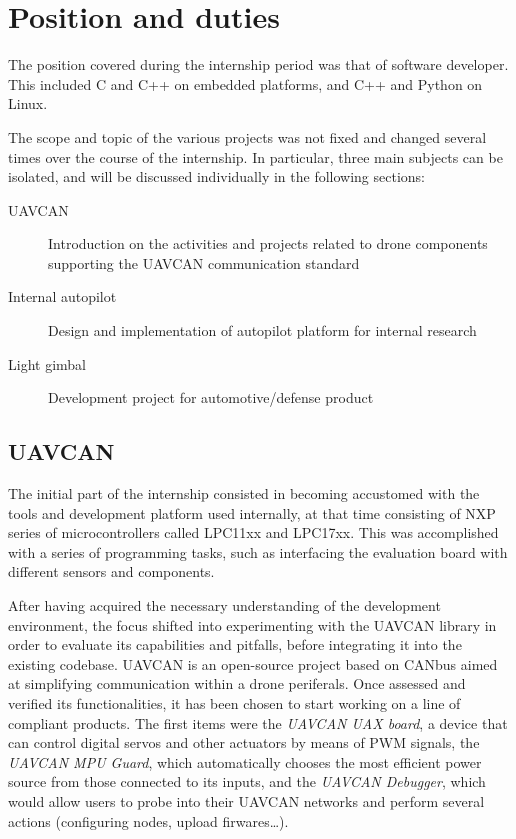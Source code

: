 \section{Position and duties}
The position covered during the internship period was that of software developer.
This included C and C++ on embedded platforms, and C++ and Python on Linux.

The scope and topic of the various projects was not fixed and changed several times over the course of the internship. 
In particular, three main subjects can be isolated, and will be discussed individually in the following sections:

\begin{description}  
\item [UAVCAN] Introduction on the activities and projects related to drone components supporting the UAVCAN communication standard
\item [Internal autopilot] Design and implementation of autopilot platform for internal research  
\item [Light gimbal] Development project for automotive/defense product 
\end{description}


\subsection{UAVCAN}
The initial part of the internship consisted in becoming accustomed with the tools and development platform used internally, at that time consisting of NXP series of microcontrollers called LPC11xx and LPC17xx.
This was accomplished with a series of programming tasks, such as interfacing the evaluation board with different sensors and components.

After having acquired the necessary understanding of the development environment, the focus shifted into experimenting with the UAVCAN library in order to evaluate its capabilities and pitfalls, before integrating it into the existing codebase.
UAVCAN is an open-source project based on CANbus aimed at simplifying communication within a drone periferals.
Once assessed and verified its functionalities, it has been chosen to start working on a line of compliant products.
The first items were the \emph{UAVCAN UAX board}, a device that can control digital servos and other actuators by means of PWM signals, the \emph{UAVCAN MPU Guard}, which automatically chooses the most efficient power source from those connected to its inputs, and the \emph{UAVCAN Debugger}, which would allow users to probe into their UAVCAN networks and perform several actions (configuring nodes, upload firwares\dots).

